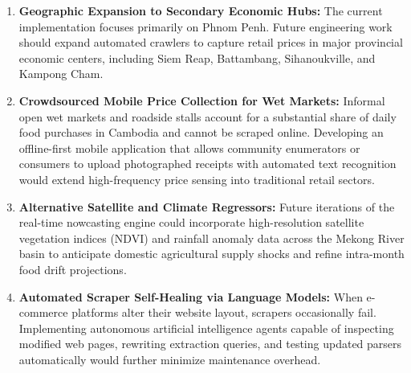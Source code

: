 \begin{enumerate}
    \item \textbf{Geographic Expansion to Secondary Economic Hubs:} The current implementation focuses primarily on Phnom Penh. Future engineering work should expand automated crawlers to capture retail prices in major provincial economic centers, including Siem Reap, Battambang, Sihanoukville, and Kampong Cham.
    \item \textbf{Crowdsourced Mobile Price Collection for Wet Markets:} Informal open wet markets and roadside stalls account for a substantial share of daily food purchases in Cambodia and cannot be scraped online. Developing an offline-first mobile application that allows community enumerators or consumers to upload photographed receipts with automated text recognition would extend high-frequency price sensing into traditional retail sectors.
    \item \textbf{Alternative Satellite and Climate Regressors:} Future iterations of the real-time nowcasting engine could incorporate high-resolution satellite vegetation indices (NDVI) and rainfall anomaly data across the Mekong River basin to anticipate domestic agricultural supply shocks and refine intra-month food drift projections.
    \item \textbf{Automated Scraper Self-Healing via Language Models:} When e-commerce platforms alter their website layout, scrapers occasionally fail. Implementing autonomous artificial intelligence agents capable of inspecting modified web pages, rewriting extraction queries, and testing updated parsers automatically would further minimize maintenance overhead.
\end{enumerate}

